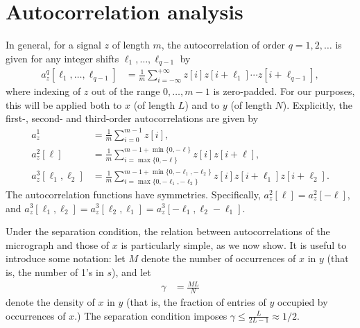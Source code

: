 \documentclass[9pt,twocolumn,twoside,lineno]{pnas-new}
\begin{document}
\section{Autocorrelation analysis} \label{sec:AC_analysis}


In general, for a signal $z$ of length $m$, the autocorrelation of order $q = 1, 2, \ldots$ is given for any integer shifts $\ell_1, \ldots, \ell_{q-1}$ by
\begin{align}
a_z^q[\ell_1,\ldots,\ell_{q-1}]  & = \frac{1}{m} \sum_{i=-\infty}^{+\infty} z[i]z[i+\ell_1]\cdots z[i+\ell_{q-1}],
\label{eq:ac_general}
\end{align}
where indexing of $z$ out of the range $0, \ldots, m-1$ is zero-padded.
For our purposes, this will be applied both to $x$ (of length $L$) and to $y$ (of length $N$).
Explicitly, the first-, second- and third-order autocorrelations are given by 
\begin{align} 
a_z^1 & = \frac{1}{m} \sum_{i=0}^{m-1} z[i], \nonumber\\
a_z^2[\ell] & = \frac{1}{m} \sum_{i = \max\{0, -\ell\}}^{m-1 + \min\{0, -\ell\}} z[i]z[i+\ell], \nonumber\\
a_z^3[\ell_1,\ell_2] & = \frac{1}{m} \sum_{i = \max\{0, -\ell_1, -\ell_2\}}^{m-1 + \min\{0, -\ell_1, -\ell_2\}} z[i]z[i+\ell_1]z[i+\ell_2]. \label{eq:ac_special}
\end{align}
The autocorrelation functions have symmetries. Specifically, $a_z^2[\ell] = a_z^2[-\ell]$, and
$a_z^3[\ell_1,\ell_2] = a_z^3[\ell_2,\ell_1]=a_z^3[-\ell_1,\ell_2-\ell_1].
$

Under the separation condition, the relation between autocorrelations of the micrograph and those of $x$ is particularly simple, as we now show. It is useful to introduce some notation: let $M$ denote the number of occurrences of $x$ in $y$ (that is, the number of 1's in $s$), and let
\begin{align}
\gamma & = \frac{M L}{N}
\end{align}
denote the density of $x$ in $y$ (that is, the fraction of entries of $y$ occupied by occurrences of $x$.) The separation condition %
imposes $\gamma\leq\frac{L}{2L-1}\approx 1/2$.
\end{document}
